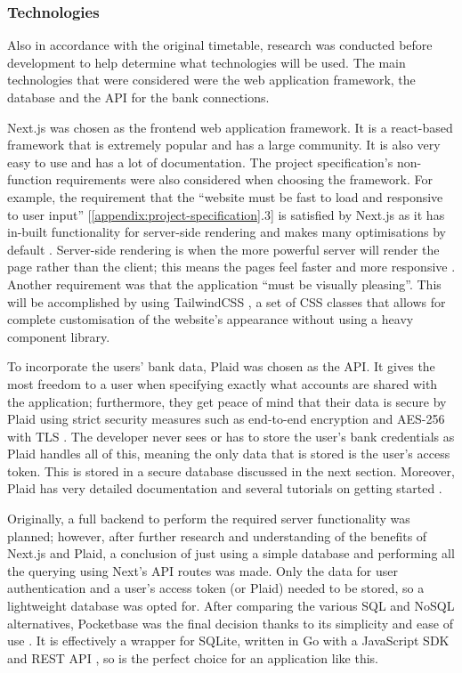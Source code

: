 \subsubsection{Technologies}
Also in accordance with the original timetable, research was conducted before development to help determine what technologies will be used. The main technologies that were considered were the web application framework, the database and the API for the bank connections.

Next.js was chosen as the frontend web application framework. It is a react-based framework that is extremely popular and has a large community. It is also very easy to use and has a lot of documentation. The project specification's non-function requirements were also considered when choosing the framework. For example, the requirement that the ``website must be fast to load and responsive to user input'' [\ref{appendix:project-specification}.3] is satisfied by Next.js as it has in-built functionality for server-side rendering and makes many optimisations by default \cite{NextjsPerformance}. Server-side rendering is when the more powerful server will render the page rather than the client; this means the pages feel faster and more responsive \cite{SSR}. Another requirement was that the application ``must be visually pleasing''. This will be accomplished by using TailwindCSS \cite{TailwindCSS}, a set of CSS classes that allows for complete customisation of the website's appearance without using a heavy component library.

To incorporate the users' bank data, Plaid was chosen as the API. It gives the most freedom to a user when specifying exactly what accounts are shared with the application; furthermore, they get peace of mind that their data is secure by Plaid using strict security measures such as end-to-end encryption and AES-256 with TLS \cite{Plaid}. The developer never sees or has to store the user's bank credentials as Plaid handles all of this, meaning the only data that is stored is the user's access token. This is stored in a secure database discussed in the next section. Moreover, Plaid has very detailed documentation and several tutorials on getting started \cite{PlaidGettingStarted}.

Originally, a full backend to perform the required server functionality was planned; however, after further research and understanding of the benefits of Next.js and Plaid, a conclusion of just using a simple database and performing all the querying using Next's API routes was made. Only the data for user authentication and a user's access token (or Plaid) needed to be stored, so a lightweight database was opted for. After comparing the various SQL and NoSQL alternatives, Pocketbase was the final decision thanks to its simplicity and ease of use \cite{NoBackendsPocketbase}. It is effectively a wrapper for SQLite, written in Go with a JavaScript SDK and REST API \cite{PocketbaseJavaScriptSDK}, so is the perfect choice for an application like this.

